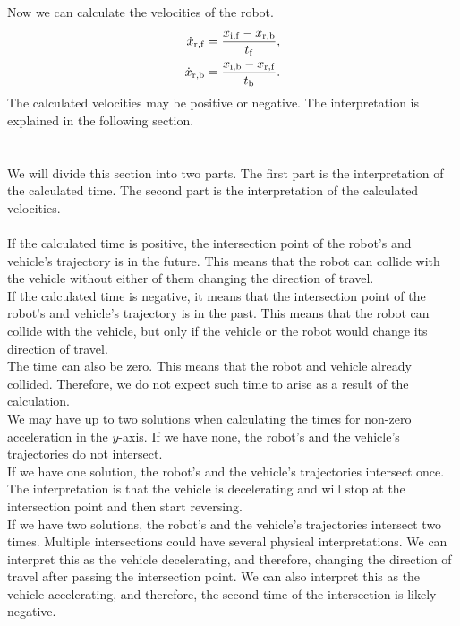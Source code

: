         Now we can calculate the velocities of the robot.
        \begin{align}
            \dot{x}_{\rm{r,f}} &= \frac{x_{\rm{i,f}}-x_{\rm{r,b}}}{t_{\rm{f}}},\\
            \dot{x}_{\rm{r,b}} &= \frac{x_{\rm{i,b}}-x_{\rm{r,f}}}{t_{\rm{b}}}.
        \end{align}
        The calculated velocities may be positive or negative. The interpretation is explained in the following section.\\\\
    \\
        We will divide this section into two parts. The first part is the interpretation of the calculated time. The second part is the interpretation of the calculated velocities.\\\\
        If the calculated time is positive, the intersection point of the robot's and vehicle's trajectory is in the future. This means that the robot can collide with the vehicle without either of them changing the direction of travel.\\
        If the calculated time is negative, it means that the intersection point of the robot's and vehicle's trajectory is in the past. This means that the robot can collide with the vehicle, but only if the vehicle or the robot would change its direction of travel.\\
        The time can also be zero. This means that the robot and vehicle already collided. Therefore, we do not expect such time to arise as a result of the calculation.\\
        We may have up to two solutions when calculating the times for non-zero acceleration in the $y$-axis. If we have none, the robot's and the vehicle's trajectories do not intersect.\\
        If we have one solution, the robot's and the vehicle's trajectories intersect once. The interpretation is that the vehicle is decelerating and will stop at the intersection point and then start reversing.\\
        If we have two solutions, the robot's and the vehicle's trajectories intersect two times. Multiple intersections could have several physical interpretations. We can interpret this as the vehicle decelerating, and therefore, changing the direction of travel after passing the intersection point. We can also interpret this as the vehicle accelerating, and therefore, the second time of the intersection is likely negative.\\
